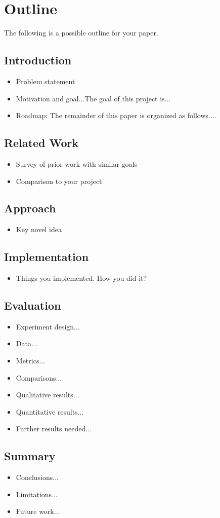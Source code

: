 \documentclass[pageno]{jpaper}
\begin{document}
\section{Outline}
The following is a possible outline for your paper.
\subsection{Introduction}
\begin{itemize}
\item Problem statement
\item Motivation and goal...The goal of this project is...
\item Roadmap: The remainder of this paper is organized as follows....
\end{itemize}

\subsection{Related Work}
\begin{itemize}
\item Survey of prior work with similar goals
\item Comparison to your project
\end{itemize}

\subsection{Approach}
\begin{itemize}
\item Key novel idea
\end{itemize}

\subsection{Implementation}
\begin{itemize}
\item Things you implemented.  How you did it?
\end{itemize}

\subsection{Evaluation}
\begin{itemize}
\item Experiment design...
\item Data...
\item Metrics...
\item Comparisons...
\item Qualitative results...
\item Quantitative results...
\item Further results needed...
\end{itemize}

\subsection{Summary}
\begin{itemize}
\item Conclusions...
\item Limitations...
\item Future work...
\end{itemize}

\cite{sha}
\cite{hmac}
\cite{prg}
\cite{nist}



\end{document}
